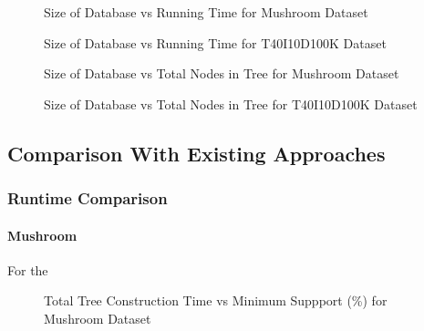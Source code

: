 		\begin{figure}[h]
		\centering
			
		\caption{Size of Database vs Running Time for Mushroom Dataset ~\cite{dataset}}
		\label{result:g_m_const_tran}
		\end{figure}
		\begin{figure}[h]
		\centering
			
		\caption{Size of Database vs Running Time for T40I10D100K Dataset ~\cite{dataset}}
		\label{result:g_t10_const_tran}
		\end{figure}
		\begin{figure}[h]
		\centering
			
		\caption{Size of Database vs Total Nodes in Tree for Mushroom Dataset ~\cite{dataset}}
		\label{result:g_m_const_tran_mem}
		\end{figure}
		\begin{figure}[h]
		\centering
			
		\caption{Size of Database vs Total Nodes in Tree for T40I10D100K Dataset ~\cite{dataset}}
		\label{result:g_t10_const_tran_mem}
		\end{figure}

		
		
		
		
\clearpage	
\subsection{Comparison With Existing Approaches}
	\subsubsection{Runtime Comparison}
		\paragraph{Mushroom} For the 

			\begin{figure}[h]
			\centering
				
			\caption{Total Tree Construction Time vs Minimum Suppport (\%) for Mushroom Dataset ~\cite{dataset}}
			\label{result:g_m_tree_construction_total}
			\end{figure}
			
